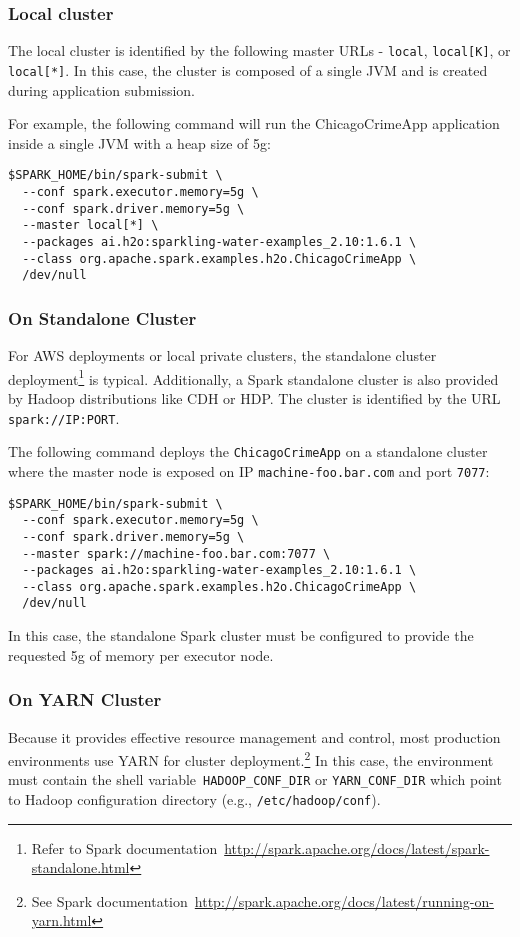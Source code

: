 \subsubsection{Local cluster}
The local cluster is identified by the following master URLs - \texttt{local}, \texttt{local[K]}, or \texttt{local[*]}. In this case, the cluster is composed of a single JVM and is created during application submission.

For example, the following command will run the ChicagoCrimeApp application inside a single JVM with a heap size of 5g:
\begin{lstlisting}[style=Bash]
$SPARK_HOME/bin/spark-submit \ 
  --conf spark.executor.memory=5g \
  --conf spark.driver.memory=5g \
  --master local[*] \
  --packages ai.h2o:sparkling-water-examples_2.10:1.6.1 \
  --class org.apache.spark.examples.h2o.ChicagoCrimeApp \
  /dev/null
\end{lstlisting}

\subsubsection{On Standalone Cluster}
For AWS deployments or local private clusters, the standalone cluster deployment\footnote{Refer to Spark documentation~\url{http://spark.apache.org/docs/latest/spark-standalone.html}} is typical. Additionally, a Spark standalone cluster is also provided by Hadoop distributions like CDH or HDP. The cluster is identified by the URL \texttt{spark://IP:PORT}.

The following command deploys the \texttt{ChicagoCrimeApp} on a standalone cluster where the master node is exposed on IP \texttt{machine-foo.bar.com} and port \texttt{7077}:

\begin{lstlisting}[style=Bash]
$SPARK_HOME/bin/spark-submit \ 
  --conf spark.executor.memory=5g \
  --conf spark.driver.memory=5g \
  --master spark://machine-foo.bar.com:7077 \
  --packages ai.h2o:sparkling-water-examples_2.10:1.6.1 \
  --class org.apache.spark.examples.h2o.ChicagoCrimeApp \
  /dev/null
\end{lstlisting}

In this case, the standalone Spark cluster must be configured to provide the requested 5g of memory per executor node. 

\subsubsection{On YARN Cluster}
Because it provides effective resource management and control, most production environments use YARN for cluster deployment.\footnote{See Spark documentation~\url{http://spark.apache.org/docs/latest/running-on-yarn.html}} 
In this case, the environment must contain the shell variable~\texttt{HADOOP\_CONF\_DIR} or \texttt{YARN\_CONF\_DIR} which point to Hadoop configuration directory (e.g., \texttt{/etc/hadoop/conf}).

